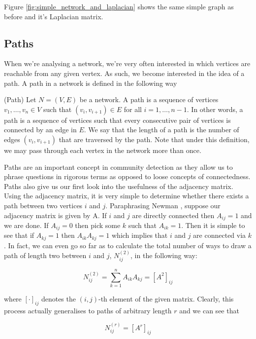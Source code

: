 Figure \ref{fig:simple_network_and_laplacian} shows the same simple graph as before and it's Laplacian matrix.

\subsection{Paths}
When we're analysing a network, we're very often interested in which vertices are reachable from any given vertex. As such, we become interested in the idea of a path. A path in a network is defined in the following way

\begin{definition}{(Path)}
    Let $N = (V, E)$ be a network. A path is a sequence of vertices $v_1, \dots, v_n \in V$ such that $(v_i, v_{i+1}) \in E$ for all $i = 1, \dots, n-1$. In other words, a path is a sequence of vertices such that every consecutive pair of vertices is connected by an edge in $E$. We say that the length of a path is the number of edges $(v_i, v_{i+1})$ that are traversed by the path. Note that under this definition, we may pass through each vertex in the network more than once.
\end{definition}

Paths are an important concept in community detection as they allow us to phrase questions in rigorous terms as opposed to loose concepts of connectedness. Paths also give us our first look into the usefulness of the adjacency matrix. Using the adjacency matrix, it is very simple to determine whether there exists a path between two vertices $i$ and $j$. Paraphrasing Newman \cite[137]{newman10}, suppose our adjacency matrix is given by A. If $i$ and $j$ are directly connected then $A_{ij} = 1$ and we are done. If $A_{ij} = 0$ then pick some $k$ such that $A_{ik} = 1$. Then it is simple to see that if $A_{kj} = 1$ then $A_{ik}A_{kj} = 1$ which implies that $i$ and $j$ are connected via $k$. In fact, we can even go so far as to calculate the total number of ways to draw a path of length two between $i$ and $j$, $N^{(2)}_{ij}$, in the following way:

$$
N_{ij}^{(2)} = \sum_{k=1}^n A_{ik}A_{kj} = [A^2]_{ij}
$$

where $[\cdot]_{ij}$ denotes the $(i, j)$-th element of the given matrix. Clearly, this process actually generalises to paths of arbitrary length $r$ and we can see that

$$
N_{ij}^{(r)} = [A^r]_{ij}
$$

